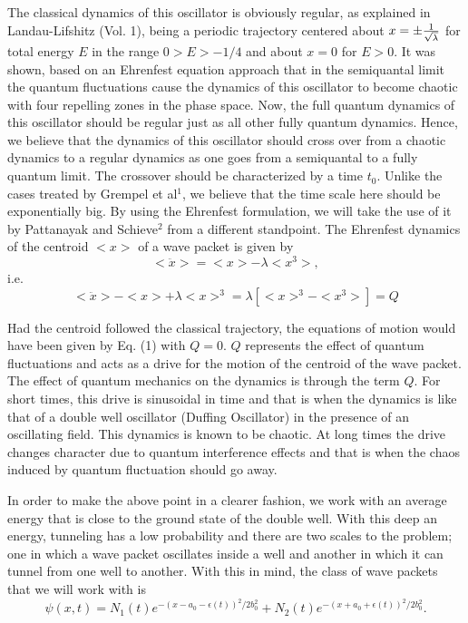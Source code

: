 The classical dynamics of this oscillator is obviously regular, as
explained in Landau-Lifshitz (Vol. 1), being a periodic trajectory
centered about $x  
= \pm {1\over \sqrt{\lambda}}$ for total energy $E$ in the range $0 > E 
> -1/4$ and about $x=0$ for $E>0$. It was shown, based on an
Ehrenfest equation approach that in the semiquantal limit the quantum
fluctuations cause the dynamics of this oscillator to become chaotic
with four repelling zones in the phase space. Now, the full quantum
dynamics of this oscillator should be regular just as all other fully
quantum dynamics. Hence, we believe that the dynamics of this
oscillator should cross over from a chaotic dynamics to a regular
dynamics as one goes from a semiquantal to a fully quantum limit. The
crossover should be characterized by a time $t_0$. Unlike the cases
treated by Grempel et al$^1$, we believe that the time scale here
should be exponentially big. By using the Ehrenfest formulation, we
will take the use of it by Pattanayak and Schieve$^2$ from a different 
standpoint. The Ehrenfest dynamics of the centroid $<x>$ of a wave
packet is given by
$$
<\ddot x> = <x> - \lambda <x^3> ,
$$
i.e.
\begin{equation}
<\ddot x> - <x> + \lambda <x>^3 = \lambda [<x>^3 - <x^3>] = Q
\end{equation}

Had the centroid followed the classical trajectory, the equations of
motion would have been given by Eq. (1) with $Q=0$. $Q$ represents the 
effect of quantum fluctuations and acts as a drive for the motion of
the centroid of the wave packet. The effect of quantum mechanics on
the dynamics is through the term $Q$. For short times, this drive is
sinusoidal in time and that is when the dynamics is like that of a
double well oscillator (Duffing Oscillator) in the presence of an
oscillating field. This dynamics is known to be chaotic. At long times 
the drive changes character due to quantum interference effects and
that is when the chaos induced by quantum fluctuation should go away.

In order to make the above point in a clearer fashion, we work with an 
average energy that is close to the ground state of the double
well. With this deep an energy, tunneling has a low probability and
there are two scales to the problem; one in which a wave packet
oscillates inside a well and another in which it can tunnel from one
well to another. With this in mind, the class of wave packets that we
will work with is
\begin{equation}
\psi (x,t) = N_1 (t) e^{- (x-a_0 - \epsilon (t))^2/2 b^2_0} + N_2 (t) 
e^{- (x+a_0 + \epsilon (t))^2/2 b^2_0} .
\end{equation}

